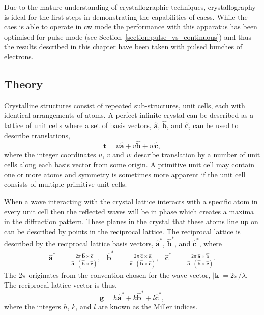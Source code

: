 Due to the mature understanding of crystallographic techniques, crystallography is ideal for the first steps in demonstrating the capabilities of \glspl{caes}.
While the \gls{caes} is able to operate in \gls{cw} mode the performance with this apparatus has been optimised for pulse mode (see Section~\ref{section:pulse_vs_continuous}) and thus the results described in this chapter have been taken with pulsed bunches of electrons.

\subsection{Theory}

Crystalline structures consist of repeated sub-structures, unit cells, each with identical arrangements of atoms.
A perfect infinite crystal can be described as a lattice of unit cells where a set of basis vectors, $\mathbf{\hat{a}}$, $\mathbf{\hat{b}}$, and $\mathbf{\hat{c}}$, can be used to describe translations,
\begin{equation}
\mathbf{t} = u\mathbf{\hat{a}} + v\mathbf{\hat{b}} + w\mathbf{\hat{c}},
\end{equation}
where the integer coordinates $u$, $v$ and $w$ describe translation by a number of unit cells along each basis vector from some origin.
A primitive unit cell may contain one or more atoms and symmetry is sometimes more apparent if the unit cell consists of multiple primitive unit cells.

When a wave interacting with the crystal lattice interacts with a specific atom in every unit cell then the reflected waves will be in phase which creates a maxima in the diffraction pattern.
These planes in the crystal that these atoms line up on can be described by points in the reciprocal lattice.
The reciprocal lattice is described by the reciprocal lattice basis vectors, $\mathbf{\hat{a}^*}$, $\mathbf{\hat{b}^*}$, and $\mathbf{\hat{c}^*}$, where
\begin{align}
\mathbf{\hat{a}^*}&=\frac{2\pi\:\mathbf{\hat{b}}\times\mathbf{\hat{c}}}{\mathbf{\hat{a}}\cdot (\mathbf{\hat{b}} \times \mathbf{\hat{c}})},  &  \mathbf{\hat{b}^*}&=\frac{2\pi\:\mathbf{\hat{c}}\times\mathbf{\hat{a}}}{\mathbf{\hat{a}}\cdot (\mathbf{\hat{b}} \times \mathbf{\hat{c}})},  &  \mathbf{\hat{c}^*}&=\frac{2\pi\:\mathbf{\hat{a}}\times\mathbf{\hat{b}}}{\mathbf{\hat{a}}\cdot (\mathbf{\hat{b}} \times \mathbf{\hat{c}})}.
\end{align}
The $2\pi$ originates from the convention chosen for the wave-vector, $|\mathbf{k}|=2\pi/\lambda$. The reciprocal lattice vector is thus,
\begin{equation}
\mathbf{g} = h\mathbf{\hat{a}^*} + k\mathbf{\hat{b}^*} + l\mathbf{\hat{c}^*},
\end{equation}
where the integers $h$, $k$, and $l$ are known as the Miller indices.

